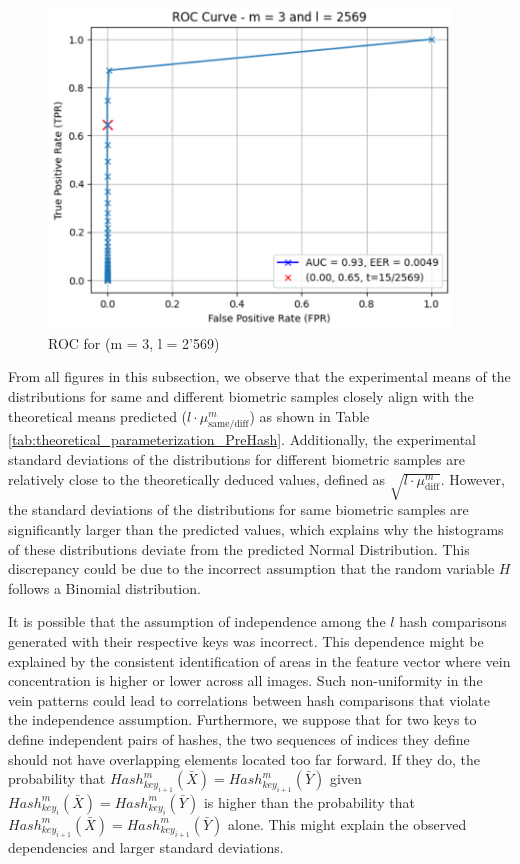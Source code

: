 \begin{enumerate}
\begin{itemize}
            \begin{figure}[H]
                    \centering
                    \includegraphics[width=\linewidth,height=8.5cm,keepaspectratio]{latex-img/FNR-FPR_ROC_TPR_config3.png}
                    \caption{ROC for (m = 3, l = 2'569)}
                    \label{FNR-FPR_ROC_TPR_config3}
            \end{figure}
        \end{itemize}
\end{enumerate}

From all figures in this subsection, we observe that the experimental means of the distributions for same and different biometric samples closely align with the theoretical means predicted (\(l\cdot\mu_{\text{same/diff}}^m\)) as shown in Table \ref{tab:theoretical_parameterization_PreHash}. Additionally, the experimental standard deviations of the distributions for different biometric samples are relatively close to the theoretically deduced values, defined as \(\sqrt{l\cdot\mu_{\text{diff}}^m}\). However, the standard deviations of the distributions for same biometric samples are significantly larger than the predicted values, which explains why the histograms of these distributions deviate from the predicted Normal Distribution. This discrepancy could be due to the incorrect assumption that the random variable \(H\) follows a Binomial distribution. 

It is possible that the assumption of independence among the \(l\) hash comparisons generated with their respective keys was incorrect. This dependence might be explained by the consistent identification of areas in the feature vector where vein concentration is higher or lower across all images. Such non-uniformity in the vein patterns could lead to correlations between hash comparisons that violate the independence assumption. Furthermore, we suppose that for two keys to define independent pairs of hashes, the two sequences of indices they define should not have overlapping elements located too far forward. If they do, the probability that \( Hash_{key_{i+1}}^m(\bar{X}) = Hash_{key_{i+1}}^m(\bar{Y}) \) given \( Hash_{key_{i}}^m(\bar{X}) = Hash_{key_{i}}^m(\bar{Y}) \) is higher than the probability that \( Hash_{key_{i+1}}^m(\bar{X}) = Hash_{key_{i+1}}^m(\bar{Y}) \)
alone. This might explain the observed dependencies and larger standard deviations.


